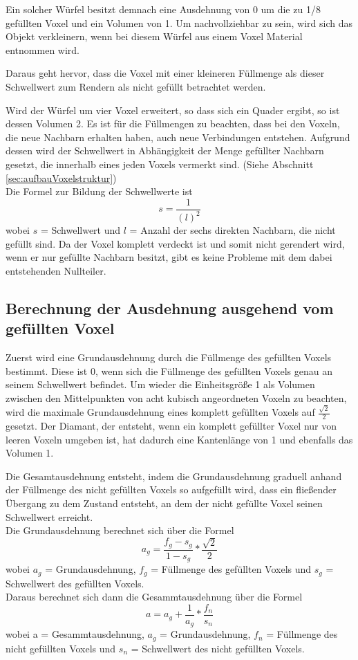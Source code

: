 Ein solcher Würfel besitzt demnach eine Ausdehnung von 0 um die zu 1/8 gefüllten Voxel und ein Volumen von 1. Um nachvollziehbar zu sein, wird sich das Objekt verkleinern, wenn bei diesem Würfel aus einem Voxel Material entnommen wird.

Daraus geht hervor, dass die Voxel mit einer kleineren Füllmenge als dieser Schwellwert zum Rendern als nicht gefüllt betrachtet werden.

Wird der Würfel um vier Voxel erweitert, so dass sich ein Quader ergibt, so ist dessen Volumen 2. Es ist für die Füllmengen zu beachten, dass bei den Voxeln, die neue Nachbarn erhalten haben, auch neue Verbindungen entstehen. Aufgrund dessen wird der Schwellwert in Abhängigkeit der Menge gefüllter Nachbarn gesetzt, die innerhalb eines jeden Voxels vermerkt sind. (Siehe Abschnitt \ref{sec:aufbauVoxelstruktur})
\\

Die Formel zur Bildung der Schwellwerte ist
\[s = \frac{1}{(l)^{2}}\]
wobei $s$ = Schwellwert und $l$ = Anzahl der sechs direkten Nachbarn, die nicht gefüllt sind. Da der Voxel komplett verdeckt ist und somit nicht gerendert wird, wenn er nur gefüllte Nachbarn besitzt, gibt es keine Probleme mit dem dabei entstehenden Nullteiler.

\subsection{Berechnung der Ausdehnung ausgehend vom gefüllten Voxel}
Zuerst wird eine Grundausdehnung durch die Füllmenge des gefüllten Voxels bestimmt. Diese ist 0, wenn sich die Füllmenge des gefüllten Voxels genau an seinem Schwellwert befindet. Um wieder die Einheitsgröße 1 als Volumen zwischen den Mittelpunkten von acht kubisch angeordneten Voxeln zu beachten, wird die maximale Grundausdehnung eines komplett gefüllten Voxels auf $\frac{\sqrt{2}}{2}$ gesetzt. Der Diamant, der entsteht, wenn ein komplett gefüllter Voxel nur von leeren Voxeln umgeben ist, hat dadurch eine Kantenlänge von 1 und ebenfalls das Volumen 1.

Die Gesamtausdehnung entsteht, indem die Grundausdehnung graduell anhand der Füllmenge des nicht gefüllten Voxels so aufgefüllt wird, dass ein fließender Übergang zu dem Zustand entsteht, an dem der nicht gefüllte Voxel seinen Schwellwert erreicht.
\\

Die Grundausdehnung berechnet sich über die Formel
\[a_g= \frac{f_g-s_g}{1-s_g}*\frac{\sqrt{2}}{2}\]
wobei $a_g$ = Grundausdehnung, $f_g$ = Füllmenge des gefüllten Voxels und $s_g$ = Schwellwert des gefüllten Voxels.
\\

Daraus berechnet sich dann die Gesammtausdehnung über die Formel
\[a = a_g + \frac{1}{a_g} * \frac{f_n}{s_n}\]
wobei a = Gesammtausdehnung, $a_g$ = Grundausdehnung, $f_n$ = Füllmenge des nicht gefüllten Voxels und $s_n$ = Schwellwert des nicht gefüllten Voxels.
